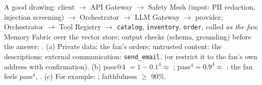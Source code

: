  A good drawing: client $\to$ API Gateway $\to$ Safety Mesh (input: PII redaction, injection screening) $\to$ Orchestrator $\to$ LLM Gateway $\to$ provider; Orchestrator $\to$ Tool Registry $\to$ \texttt{catalog}, \texttt{inventory}, \texttt{order}, called \emph{as the fan}; Memory Fabric over the vector store; output checks (schema, grounding) before the answer; . (a) Private data: the fan's orders; untrusted content: the descriptions; external communication: \texttt{send\_email}.  (or restrict it to the fan's own address with confirmation). (b) pass@4 $= 1 - 0.1^4 \approx$ ; pass$^4 = 0.9^4 \approx$ : the fan feels pass$^4$, . (c) For example: ; faithfulness $\ge$ 90\%.

